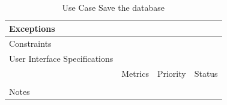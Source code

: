 \begin{table}[H]
\begin{tabularx}{\linewidth}{|l|X|X|X|}
            \hline Exceptions                    & \multicolumn{3}{l|}{}                                                                                 \\

            \hline Constraints                   & \multicolumn{3}{l|}{}                                                                                 \\

            \hline User Interface Specifications & \multicolumn{3}{l|}{}                                                                                 \\

            \hline \multirow{2}{*}{}             & Metrics                                                                           & Priority & Status \\
            \cline{2-4}                          &                                                                                   &          &        \\
            \hline Notes                         & \multicolumn{3}{l|}{}                                                                                 \\
            \hline
      \end{tabularx}
      \caption{Use Case Save the database}
      \label{tab:use_case_save_the_database}
\end{table}

